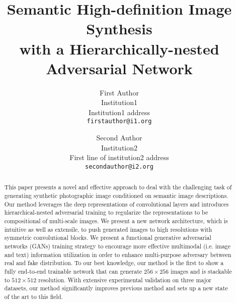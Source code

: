 \documentclass[10pt,twocolumn,letterpaper]{article}
\begin{document}
\title{Semantic High-definition Image Synthesis \\ with a Hierarchically-nested Adversarial Network}

\author{First Author\\
Institution1\\
Institution1 address\\
{\tt\small firstauthor@i1.org}
\and
Second Author\\
Institution2\\
First line of institution2 address\\
{\tt\small secondauthor@i2.org}
}

\maketitle

\begin{abstract}
This paper presents a novel  and effective approach to deal with the challenging task of generating synthetic photographic image conditioned on semantic image descriptions. Our method leverages the deep representations of convolutional layers and introduces hierarchical-nested adversarial training to regularize the representations to be compositional of multi-scale images. We present a new network architecture, which is intuitive as well as extensile, to push generated images to high resolutions with symmetric convolutional blocks.  We present a functional generative adversarial networks (GANs) training strategy to encourage more effective multimodal (i.e. image and text) information utilization in order to enhance multi-purpose adversary between real and fake distribution. To our best knowledge, our method is the first to show a fully end-to-end trainable network that can generate $256{\times}256$ images and is stackable to $512{\times}512$ resolution. With extensive experimental validation on three major datasets, our method significantly improves previous method and sets up a new state of the art to this field. 

\end{abstract}


\end{document}
